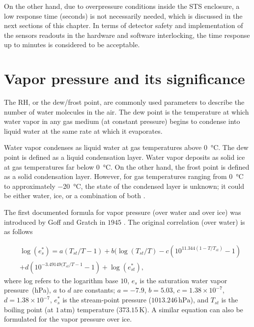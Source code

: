 On the other hand, due to overpressure conditions inside the \gls{STS} enclosure, a low response time (seconds) is not necessarily needed, which is discussed in the next sections of this chapter. In terms of detector safety and implementation of the sensors readouts in the hardware and software interlocking, the time response up to minutes is considered to be acceptable. 

\section{Vapor pressure and its significance}

The \gls{RH}, or the dew/frost point, are commonly used parameters to describe the number of water molecules in the air. The dew point is the temperature at which water vapor in any gas medium (at constant pressure) begins to condense into liquid water at the same rate at which it evaporates.

Water vapor condenses as liquid water at gas temperatures above \SI{0}{\celsius}. The dew point is defined as a liquid condensation layer. Water vapor deposits as solid ice at gas temperatures far below \SI{0}{\celsius}. On the other hand, the frost point is defined as a solid condensation layer. However, for gas temperatures ranging from \SI{0}{\celsius} to approximately \SI{-20}{\celsius}, the state of the condensed layer is unknown; it could be either water, ice, or a combination of both \cite{nie_dewpoint}. 


The first documented formula for vapor pressure (over water and over ice) was introduced by Goff and Gratch in $1945$ \cite{goff_gratch}. The original correlation (over water) is as follows

\begin{equation}
\label{gratch}
\begin{split}
    &\log({e}^{*}_{s}) = a(T_{st}/T - 1) + b(\log(T_{st}/T) - c(10^{11.344(1-T/T_{st})} - 1) \\
    &+ d(10^{-3.49149(T_{st}/T - 1} -1) + \log(e^{*}_{st}),
\end{split}
\end{equation}
where log refers to the logarithm base $10$, $e_{s}$ is the saturation water vapor pressure~(hPa), $a$ to $d$ are constants; $a = - 7.9$, $b=5.03$, $c=1.38\times10^{-7}$, $d=1.38\times10^{-7}$, $e^{*}_{s}$ is the stream-point pressure ($1013.246\,\mathrm{hPa}$), and $T_{st}$ is the boiling point (at $1$\,atm) temperature ($373.15$\,K). A similar equation can also be formulated for the vapor pressure over ice. 

